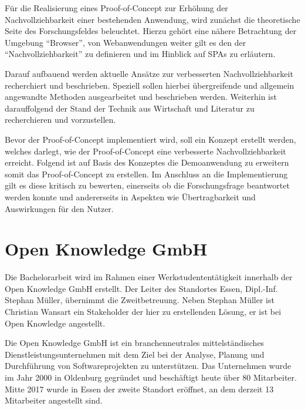 \vspace{-0.25\baselineskip}

Für die Realisierung eines Proof-of-Concept zur Erhöhung der Nachvollziehbarkeit einer bestehenden Anwendung, wird zunächst die theoretische Seite des Forschungsfeldes beleuchtet. Hierzu gehört eine nähere Betrachtung der Umgebung \enquote{Browser}, von Webanwendungen weiter gilt es den der \enquote{Nachvollziehbarkeit} zu definieren und im Hinblick auf SPAs zu erläutern.

Darauf aufbauend werden aktuelle Ansätze zur verbesserten Nachvollziehbarkeit recherchiert und beschrieben. Speziell sollen hierbei übergreifende und allgemein angewandte Methoden ausgearbeitet und beschrieben werden. Weiterhin ist darauffolgend der Stand der Technik aus Wirtschaft und Literatur zu recherchieren und vorzustellen.

Bevor der Proof-of-Concept implementiert wird, soll ein Konzept erstellt werden, welches darlegt, wie der Proof-of-Concept eine verbesserte Nachvollziehbarkeit erreicht. Folgend ist auf Basis des Konzeptes die Demoanwendung zu erweitern somit das Proof-of-Concept zu erstellen. Im Anschluss an die Implementierung gilt es diese kritisch zu bewerten, einerseits ob die Forschungsfrage beantwortet werden konnte und andererseits in Aspekten wie Übertragbarkeit und Auswirkungen für den Nutzer.

\vspace{-0.25\baselineskip}

\section{Open Knowledge GmbH}

\vspace{-0.50\baselineskip}

Die Bachelorarbeit wird im Rahmen einer Werkstudententätigkeit innerhalb der Open Knowledge GmbH erstellt. Der Leiter des Standortes Essen, Dipl.-Inf. Stephan Müller, übernimmt die Zweitbetreuung. Neben Stephan Müller ist Christian Wansart ein Stakeholder der hier zu erstellenden Lösung, er ist bei Open Knowledge angestellt.

Die Open Knowledge GmbH ist ein branchenneutrales mittelständisches Dienstleistungsunternehmen mit dem Ziel bei der Analyse, Planung und Durchführung von Softwareprojekten zu unterstützen. Das Unternehmen wurde im Jahr 2000 in Oldenburg gegründet und beschäftigt heute über 80 Mitarbeiter. Mitte 2017 wurde in Essen der zweite Standort eröffnet, an dem derzeit 13 Mitarbeiter angestellt sind.

